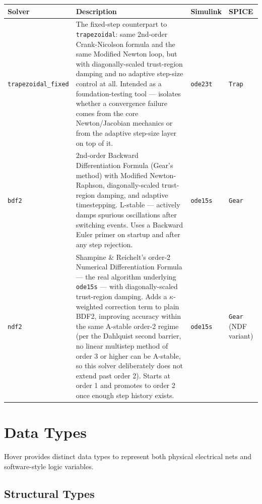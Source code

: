 \documentclass[11pt, a4paper]{article}
\newcommand{\code}[1]{\texttt{\small #1}}
\begin{document}
\begin{center}
\renewcommand{\arraystretch}{1.5}
\begin{tabular}{@{} L{3.5cm} L{6.8cm} L{2.2cm} L{2cm} @{}}
\toprule
\textbf{Solver} & \textbf{Description} & \textbf{Simulink} & \textbf{SPICE} \\
\midrule
\code{trapezoidal\_fixed}
& The fixed-step counterpart to \code{trapezoidal}: same 2nd-order
      Crank-Nicolson formula and the same Modified Newton loop, but with
      diagonally-scaled trust-region damping and no
      adaptive step-size control at all. Intended as a foundation-testing
      tool --- isolates whether a convergence failure comes from the core
      Newton/Jacobian mechanics or from the adaptive step-size layer on
      top of it.
& \code{ode23t}
& \code{Trap} \\
\code{bdf2}
& 2nd-order Backward Differentiation Formula (Gear's method) with
      Modified Newton-Raphson, diagonally-scaled trust-region damping, and
      adaptive timestepping. L-stable --- actively damps spurious
      oscillations after switching events. Uses a Backward Euler primer
      on startup and after any step rejection.
& \code{ode15s}
& \code{Gear} \\
\code{ndf2}
& Shampine \& Reichelt's order-2 Numerical Differentiation Formula ---
      the real algorithm underlying \code{ode15s} --- with diagonally-scaled
      trust-region damping. Adds a $\kappa$-weighted correction term to
      plain BDF2, improving accuracy within the same A-stable order-2
      regime (per the Dahlquist second barrier, no linear multistep method
      of order 3 or higher can be A-stable, so this solver deliberately
      does not extend past order 2). Starts at order 1 and promotes to
      order 2 once enough step history exists.
& \code{ode15s}
& \code{Gear} (NDF variant) \\
\bottomrule
\end{tabular}
\end{center}
\newpage
\section{Data Types}

Hover provides distinct data types to represent both physical electrical nets and software-style logic variables.

\subsection{Structural Types}
\end{document}
